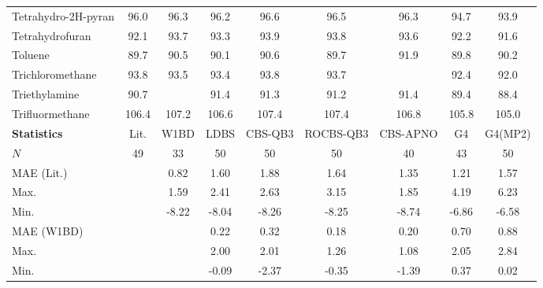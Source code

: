 {\begin{longtable}{m{3.1cm} | c c c c c c c c}
Tetrahydro-2H-pyran              &  96.0     &   96.3   &   96.2   &    96.6     &    96.5    &   96.3   &  94.7   &    93.9   \\
Tetrahydrofuran                  &  92.1     &   93.7   &   93.3   &    93.9     &    93.8    &   93.6   &  92.2   &    91.6   \\
Toluene                          &  89.7     &   90.5   &   90.1   &    90.6     &    89.7    &   91.9   &  89.8   &    90.2   \\
Trichloromethane                 &  93.8     &   93.5   &   93.4   &    93.8     &    93.7    &          &  92.4   &    92.0   \\
Triethylamine                    &  90.7     &          &   91.4   &    91.3     &    91.2    &   91.4   &  89.4   &    88.4   \\
Trifluormethane                  & 106.4     &  107.2   &  106.6   &   107.4     &   107.4    &  106.8   & 105.8   &   105.0   \\
\hline
\textbf{Statistics}             & Lit.       &  W1BD    &    LDBS  &    CBS-QB3  &  ROCBS-QB3  &  CBS-APNO &    G4  &    G4(MP2)\\
\hline
$N$                              &    49     &     33   &     50   &      50     &      50     &     40    &    43   &     50   \\
MAE (Lit.)                       &           &   0.82   &   1.60   &    1.88     &    1.64     &   1.35    &  1.21   &   1.57   \\
Max.                             &           &   1.59   &   2.41   &    2.63     &    3.15     &   1.85    &  4.19   &   6.23   \\
Min.                             &           &  -8.22   &  -8.04   &   -8.26     &   -8.25     &  -8.74    & -6.86   &  -6.58   \\
MAE (W1BD)                       &           &          &   0.22   &    0.32     &    0.18     &   0.20    &  0.70   &   0.88   \\
Max.                             &           &          &   2.00   &    2.01     &    1.26     &   1.08    &  2.05   &   2.84   \\
Min.                             &           &          &  -0.09   &   -2.37     &   -0.35     &  -1.39    &  0.37   &   0.02   \\
\end{longtable}
}
